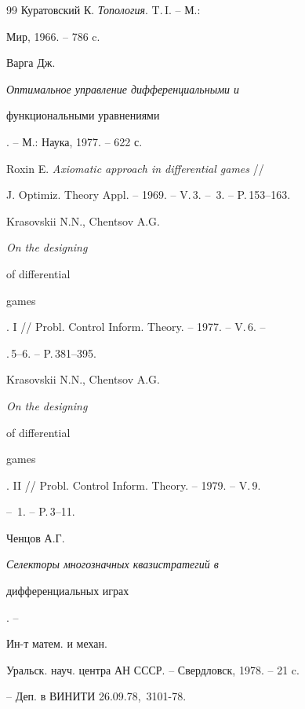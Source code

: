 \begin{thebibliography}{99}
 Куратовский К. {\em Топология}. T.\,I. -- М.:


Мир, 1966. -- 786 c.





 Варга Дж. {\em Оптимальное управление дифференциальными и


функциональными уравнениями}. -- М.: Наука, 1977. -- 622 с.





 Roxin E. {\em Axiomatic approach in differential games} //


J. Optimiz. Theory Appl. -- 1969. -- V.\,3. -- \No\,3. -- P.\,153--163.





 Krasovskii N.N., Chentsov A.G. {\em On the designing


of differential


games}. I // Probl. Control Inform. Theory. -- 1977. -- V.\,6. --


\No.\,5--6. -- P.\,381--395.





 Krasovskii N.N., Chentsov A.G. {\em On the designing


of differential


games}. II // Probl. Control Inform. Theory. -- 1979. -- V.\,9.


-- \No\,1. -- P.\,3--11.





 Ченцов А.Г. {\em Селекторы многозначных квазистратегий в


дифференциальных играх}. -- \linebreak


Ин-т матем. и механ.


Уральск. науч. центра АН СССР. -- Свердловск, 1978. -- 21 c.


-- Деп. в ВИНИТИ 26.09.78, \No\,3101-78.





\end{thebibliography} 


 


\vskip 0.5cm 


 








 


\label{end} 


 



